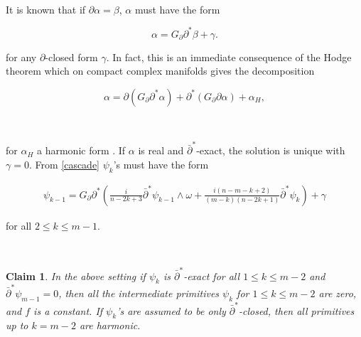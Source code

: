\documentclass[10pt,a4paper]{amsart}
\newcommand{\sbpartial}{\bar{\partial}^*}
\newcommand{\spartial}{\partial^*}
\newtheorem{claim}{Claim}[section]
\numberwithin{equation}{section}
\begin{document}
\

It is known that if $\partial \alpha = \beta$, $\alpha$ must have the form

\begin{equation}
    \alpha = G_{\partial} \partial^* \beta + \gamma.
\end{equation}

\noindent for any $\partial$-closed form $\gamma$. In fact, this is an immediate consequence of the Hodge theorem which on compact complex manifolds gives the decomposition

$$\alpha = \partial (G_{\partial} \spartial \alpha) + \spartial(G_{\partial} \partial \alpha) + \alpha_{H},$$

\

\noindent for $\alpha_H$ a harmonic form \cite[Chapter $0$]{Griffiths-Harris}. If $\alpha$ is real and $\sbpartial$-exact, the solution is unique with $\gamma =0$. From \eqref{cascade} $\psi_{k}$'s must have the form

\begin{equation}\label{dbar-problem}
    \begin{aligned}
         \psi_{k-1} = G_{\partial} \partial^*\left( \frac{i}{n-2k+ 3} \sbpartial \psi_{k-1} \wedge \omega + \frac{i(n-m-k+2)}{(m-k)(n-2k+1)}\sbpartial \psi_{k} \right) + \gamma
    \end{aligned}
\end{equation}

\noindent for all $2 \leq k \leq m-1$.



\






\begin{claim}\label{harmonicity-claim}
    In the above setting if $\psi_k$ is $\sbpartial$-exact for all $1 \leq k \leq m-2 $ and $\sbpartial \psi_{m-1} = 0$, then all the intermediate primitives $\psi_{k}$ for $1 \leq k \leq m-2$ are zero, and $f$ is a constant. If $\psi_k$'s are assumed to be only $\sbpartial$-closed, then all primitives up to $k=m-2$ are harmonic.
\end{claim}




\




\end{document}
